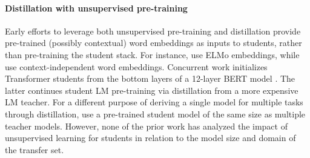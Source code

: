\paragraph{Distillation with unsupervised pre-training}
Early efforts to leverage both unsupervised pre-training and distillation provide pre-trained (possibly contextual) word embeddings as inputs to students, rather than pre-training the student stack. For instance, \citet{distillation-reading-comprehension} use ELMo embeddings, while \citep{distillation-classification,tang2019distilling} use context-independent word embeddings. Concurrent work initializes Transformer students from the bottom layers of a 12-layer BERT model \citep{truncated-pretraining,patient_kd,distil_bert}. The latter continues student LM pre-training via distillation from a more expensive LM teacher. For a different purpose of deriving a single model for multiple tasks through distillation, \citet{clark-etal-2019-bam} use a pre-trained student model of the same size as multiple teacher models. However, none of the prior work has analyzed the impact of unsupervised learning for students in relation to the model size and domain of the transfer set.
